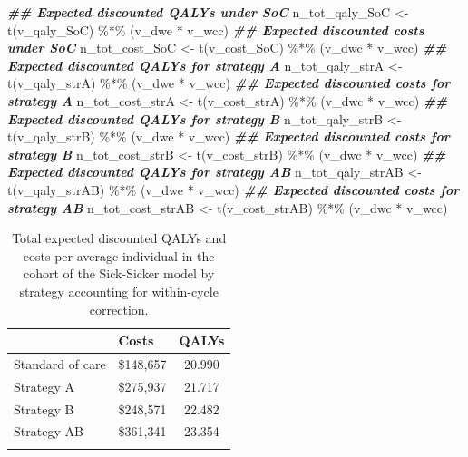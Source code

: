 \documentclass[
]{article}
\newenvironment{Shaded}{\begin{snugshade}}{\end{snugshade}}
\newcommand{\DocumentationTok}[1]{\textcolor[rgb]{0.56,0.35,0.01}{\textbf{\textit{#1}}}}
\newcommand{\FunctionTok}[1]{\textcolor[rgb]{0.00,0.00,0.00}{#1}}
\newcommand{\NormalTok}[1]{#1}
\newcommand{\OtherTok}[1]{\textcolor[rgb]{0.56,0.35,0.01}{#1}}
\newcommand{\SpecialCharTok}[1]{\textcolor[rgb]{0.00,0.00,0.00}{#1}}
\begin{document}
\begin{Shaded}
\begin{Highlighting}[]
\DocumentationTok{\#\# Expected discounted QALYs under SoC}
\NormalTok{n\_tot\_qaly\_SoC }\OtherTok{\textless{}{-}} \FunctionTok{t}\NormalTok{(v\_qaly\_SoC) }\SpecialCharTok{\%*\%}\NormalTok{ (v\_dwe }\SpecialCharTok{*}\NormalTok{ v\_wcc)}
\DocumentationTok{\#\# Expected discounted costs under SoC}
\NormalTok{n\_tot\_cost\_SoC }\OtherTok{\textless{}{-}} \FunctionTok{t}\NormalTok{(v\_cost\_SoC) }\SpecialCharTok{\%*\%}\NormalTok{ (v\_dwc }\SpecialCharTok{*}\NormalTok{ v\_wcc)}
\DocumentationTok{\#\# Expected discounted QALYs for strategy A}
\NormalTok{n\_tot\_qaly\_strA }\OtherTok{\textless{}{-}} \FunctionTok{t}\NormalTok{(v\_qaly\_strA) }\SpecialCharTok{\%*\%}\NormalTok{ (v\_dwe }\SpecialCharTok{*}\NormalTok{ v\_wcc)}
\DocumentationTok{\#\# Expected discounted costs for strategy A}
\NormalTok{n\_tot\_cost\_strA }\OtherTok{\textless{}{-}} \FunctionTok{t}\NormalTok{(v\_cost\_strA) }\SpecialCharTok{\%*\%}\NormalTok{ (v\_dwc }\SpecialCharTok{*}\NormalTok{ v\_wcc)}
\DocumentationTok{\#\# Expected discounted QALYs for strategy B}
\NormalTok{n\_tot\_qaly\_strB }\OtherTok{\textless{}{-}} \FunctionTok{t}\NormalTok{(v\_qaly\_strB) }\SpecialCharTok{\%*\%}\NormalTok{ (v\_dwe }\SpecialCharTok{*}\NormalTok{ v\_wcc)}
\DocumentationTok{\#\# Expected discounted costs for strategy B}
\NormalTok{n\_tot\_cost\_strB }\OtherTok{\textless{}{-}} \FunctionTok{t}\NormalTok{(v\_cost\_strB) }\SpecialCharTok{\%*\%}\NormalTok{ (v\_dwc }\SpecialCharTok{*}\NormalTok{ v\_wcc)}
\DocumentationTok{\#\# Expected discounted QALYs for strategy AB}
\NormalTok{n\_tot\_qaly\_strAB }\OtherTok{\textless{}{-}} \FunctionTok{t}\NormalTok{(v\_qaly\_strAB) }\SpecialCharTok{\%*\%}\NormalTok{ (v\_dwe }\SpecialCharTok{*}\NormalTok{ v\_wcc)}
\DocumentationTok{\#\# Expected discounted costs for strategy AB}
\NormalTok{n\_tot\_cost\_strAB }\OtherTok{\textless{}{-}} \FunctionTok{t}\NormalTok{(v\_cost\_strAB) }\SpecialCharTok{\%*\%}\NormalTok{ (v\_dwc }\SpecialCharTok{*}\NormalTok{ v\_wcc)}
\end{Highlighting}
\end{Shaded}

\begin{table}[!h]

\caption{\label{tab:Expected-outcomes-table}Total expected discounted QALYs and costs per average individual in the cohort of the Sick-Sicker model by strategy accounting for within-cycle correction.}
\centering
\begin{tabular}[t]{llc}
\toprule{}
  & Costs & QALYs\\
\midrule{}
Standard of care & \$148,657 & 20.990\\
Strategy A & \$275,937 & 21.717\\
Strategy B & \$248,571 & 22.482\\
Strategy AB & \$361,341 & 23.354\\
\bottomrule{}
\end{tabular}
\end{table}
\end{document}
